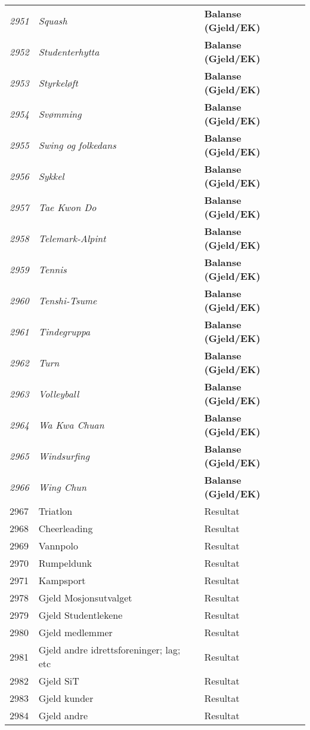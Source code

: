 \begin{longtable}{l l l}
\emph{2951} & \emph{Squash} & {\bfseries Balanse (Gjeld/EK)}\\
\emph{2952} & \emph{Studenterhytta} & {\bfseries Balanse (Gjeld/EK)}\\
\emph{2953} & \emph{Styrkeløft} & {\bfseries Balanse (Gjeld/EK)}\\
\emph{2954} & \emph{Svømming} & {\bfseries Balanse (Gjeld/EK)}\\
\emph{2955} & \emph{Swing og folkedans} & {\bfseries Balanse (Gjeld/EK)}\\
\emph{2956} & \emph{Sykkel} & {\bfseries Balanse (Gjeld/EK)}\\
\emph{2957} & \emph{Tae Kwon Do} & {\bfseries Balanse (Gjeld/EK)}\\
\emph{2958} & \emph{Telemark-Alpint} & {\bfseries Balanse (Gjeld/EK)}\\
\emph{2959} & \emph{Tennis} & {\bfseries Balanse (Gjeld/EK)}\\
\emph{2960} & \emph{Tenshi-Tsume} & {\bfseries Balanse (Gjeld/EK)}\\
\emph{2961} & \emph{Tindegruppa} & {\bfseries Balanse (Gjeld/EK)}\\
\emph{2962} & \emph{Turn} & {\bfseries Balanse (Gjeld/EK)}\\
\emph{2963} & \emph{Volleyball} & {\bfseries Balanse (Gjeld/EK)}\\
\emph{2964} & \emph{Wa Kwa Chuan} & {\bfseries Balanse (Gjeld/EK)}\\
\emph{2965} & \emph{Windsurfing} & {\bfseries Balanse (Gjeld/EK)}\\
\emph{2966} & \emph{Wing Chun} & {\bfseries Balanse (Gjeld/EK)}\\
2967 & Triatlon & Resultat\\
2968 & Cheerleading & Resultat\\
2969 & Vannpolo & Resultat\\
2970 & Rumpeldunk & Resultat\\
2971 & Kampsport & Resultat\\
2978 & Gjeld Mosjonsutvalget & Resultat\\
2979 & Gjeld Studentlekene & Resultat\\
2980 & Gjeld medlemmer & Resultat\\
2981 & Gjeld andre idrettsforeninger; lag; etc & Resultat\\
2982 & Gjeld SiT & Resultat\\
2983 & Gjeld kunder & Resultat\\
2984 & Gjeld andre & Resultat\\

\end{longtable}
